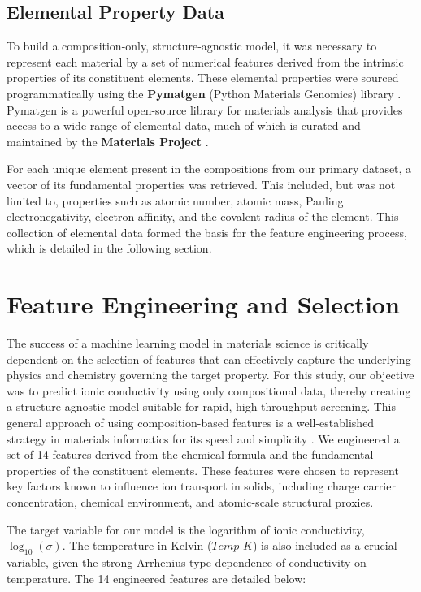 \subsection{Elemental Property Data}

To build a composition-only, structure-agnostic model, it was necessary to represent each material by a set of numerical features derived from the intrinsic properties of its constituent elements. These elemental properties were sourced programmatically using the \textbf{Pymatgen} (Python Materials Genomics) library \cite{Ong2013}. Pymatgen is a powerful open-source library for materials analysis that provides access to a wide range of elemental data, much of which is curated and maintained by the \textbf{Materials Project} \cite{Jain2013}.

For each unique element present in the compositions from our primary dataset, a vector of its fundamental properties was retrieved. This included, but was not limited to, properties such as atomic number, atomic mass, Pauling electronegativity, electron affinity, and the covalent radius of the element. This collection of elemental data formed the basis for the feature engineering process, which is detailed in the following section.


\section{Feature Engineering and Selection}

The success of a machine learning model in materials science is critically dependent on the selection of features that can effectively capture the underlying physics and chemistry governing the target property. For this study, our objective was to predict ionic conductivity using only compositional data, thereby creating a structure-agnostic model suitable for rapid, high-throughput screening. This general approach of using composition-based features is a well-established strategy in materials informatics for its speed and simplicity \cite{Meredig2014}. We engineered a set of 14 features derived from the chemical formula and the fundamental properties of the constituent elements. These features were chosen to represent key factors known to influence ion transport in solids, including charge carrier concentration, chemical environment, and atomic-scale structural proxies.

The target variable for our model is the logarithm of ionic conductivity, \(\log_{10}(\sigma)\). The temperature in Kelvin (\(Temp\_K\)) is also included as a crucial variable, given the strong Arrhenius-type dependence of conductivity on temperature. The 14 engineered features are detailed below:

